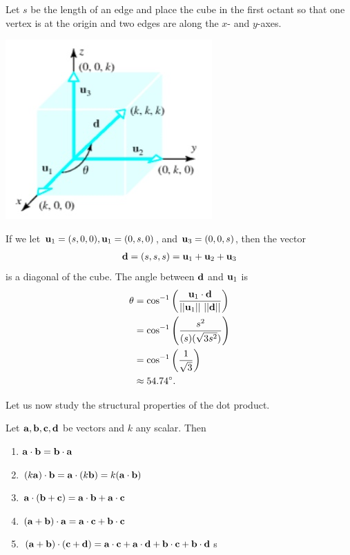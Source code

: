 \documentclass[12pt,letterpaper,reqno]{article}
\numberwithin{equation}{section}
\begin{document}
{\color{red} 
Let $s$ be the length of an edge and place the cube in the first octant so that one vertex is at the origin and two edges are along the $x$- and $y$-axes.
\begin{center}
	\includegraphics[scale=0.5]{figures_mvc/cube_coordinates}
\end{center}
If we let ${\bf u}_1=(s,0,0), {\bf u}_1=(0,s,0)$, and ${\bf u}_3=(0,0,s)$, then the vector
\begin{align*}
	{\bf d}=(s,s,s)={\bf u}_1+{\bf u}_2+{\bf u}_3
\end{align*}
is a diagonal of the cube. The angle between ${\bf d}$ and ${\bf u}_1$ is 
\begin{align*}
	\theta &=\cos^{-1}\left(\frac{{\bf u}_1 \cdot {\bf d}}{||{\bf u}_1 || \ || {\bf d}||}\right) \\
	&=\cos^{-1}\left(\frac{s^2}{(s)(\sqrt{3s^2})}\right)  \\
	&=\cos^{-1}\left(\frac{1}{\sqrt{3}}\right) \\
	&\approx 54.74^\circ.
\end{align*}
}

Let us now study the structural properties of the dot product.

\begin{prop}
	Let ${\bf a}, {\bf b}, {\bf c}, {\bf d}$ be vectors and $k$ any scalar. Then 
	\begin{enumerate}[(1)]
		\item ${\bf a}\cdot {\bf b}={\bf b} \cdot {\bf a}$
		\item $(k {\bf a})\cdot {\bf b}={\bf a}\cdot (k{\bf b})=k({\bf a}\cdot {\bf b})$
		\item ${\bf a}\cdot ({\bf b}+{\bf c})={\bf a}\cdot {\bf b}+{\bf a}\cdot {\bf c}$
		\item $({\bf a}+{\bf b})\cdot {\bf a}={\bf a}\cdot {\bf c}+{\bf b}\cdot {\bf c}$
		\item $({\bf a}+{\bf b})\cdot ({\bf c}+{\bf d})={\bf a}\cdot {\bf c}+{\bf a}\cdot {\bf d}+{\bf b}\cdot {\bf c}+{\bf b}\cdot {\bf d}$s
	\end{enumerate}
\end{prop}
\end{document}
